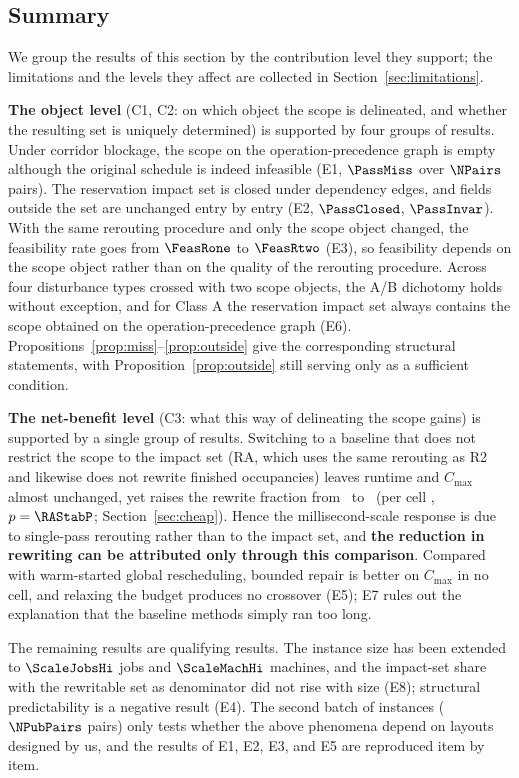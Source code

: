 \subsection{Summary}
\label{sec:exp_summary}

We group the results of this section by the contribution level they support; the limitations and the levels they affect are collected in Section~\ref{sec:limitations}.

\textbf{The object level} (C1, C2: on which object the scope is delineated, and whether the resulting set is uniquely determined) is supported by four groups of results.
Under corridor blockage, the scope on the operation-precedence graph is empty although the original schedule is indeed infeasible (E1, \(\PassMiss\) over \(\NPairs\) pairs).
The reservation impact set is closed under dependency edges, and fields outside the set are unchanged entry by entry (E2, \(\PassClosed\), \(\PassInvar\)).
With the same rerouting procedure and only the scope object changed, the feasibility rate goes from \(\FeasRone\) to \(\FeasRtwo\) (E3),
so feasibility depends on the scope object rather than on the quality of the rerouting procedure. Across four disturbance types crossed with two scope objects, the A/B dichotomy holds without exception,
and for Class A the reservation impact set always contains the scope obtained on the operation-precedence graph (E6).
Propositions~\ref{prop:miss}--\ref{prop:outside} give the corresponding structural statements,
with Proposition~\ref{prop:outside} still serving only as a sufficient condition.

\textbf{The net-benefit level} (C3: what this way of delineating the scope gains) is supported by a single group of results. Switching to a baseline that does not restrict the scope to the impact set
(RA, which uses the same rerouting as R2 and likewise does not rewrite finished occupancies) leaves runtime and \(C_{\max}\) almost unchanged,
yet raises the rewrite fraction from \ResFracCheapRtwo\ to \ResFracAllFuture\ (per cell \RAStabWTL, \(p=\RAStabP\);
Section~\ref{sec:cheap}). Hence the millisecond-scale response is due to single-pass rerouting rather than to the impact set, and
\textbf{the reduction in rewriting can be attributed only through this comparison}. Compared with warm-started global rescheduling, bounded repair is better on \(C_{\max}\)
in no cell, and relaxing the budget produces no crossover (E5); E7 rules out the explanation that the baseline methods simply ran too long.

The remaining results are qualifying results. The instance size has been extended to \(\ScaleJobsHi\) jobs and
\(\ScaleMachHi\) machines, and the impact-set share with the rewritable set as denominator did not rise with size (E8);
structural predictability is a negative result (E4). The second batch of instances (\(\NPubPairs\) pairs) only tests whether the above phenomena depend on
layouts designed by us, and the results of E1, E2, E3, and E5 are reproduced item by item.


